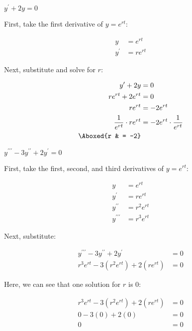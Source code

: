 \documentclass{lapchomework}
\begin{document}
\begin{problems}

\problem[11] $y^{\prime}+2y=0$

\begin{solution}

\step First, take the first derivative of $y=e^{rt}$:

\step \begin{align*}
y & = e^{rt} \\
y^{\prime} & = re^{rt}
\end{align*}

\step Next, substitute and solve for $r$:

\step \begin{align*}
y^{\prime} + 2y & = 0 \\
re^{rt} + 2e^{rt} & = 0 \\
re^{rt} & = -2e^{rt} \\
\frac{1}{e^{rt}} \cdot re^{rt} & = -2e^{rt} \cdot \frac{1}{e^{rt}} \\
\Aboxed{r & = -2}
\end{align*}
\end{solution}

\problem[13] $y^{\prime\prime\prime}-3y^{\prime\prime}+2y^{\prime}=0$

\begin{solution}

\step First, take the first, second, and third derivatives of $y=e^{rt}$:

\step \begin{align*}
y & = e^{rt} \\
y^{\prime} & = re^{rt} \\
y^{\prime\prime} & = r^2e^{rt} \\
y^{\prime\prime\prime} & = r^3e^{rt}
\end{align*}

\step Next, substitute:

\step \begin{align*}
y^{\prime\prime\prime}-3y^{\prime\prime}+2y^{\prime} & = 0 \\
r^3e^{rt} - 3(r^2e^{rt}) + 2(re^{rt}) & = 0
\end{align*}

\step Here, we can see that one solution for $r$ is $0$:

\step \begin{align*}
r^3e^{rt} - 3(r^2e^{rt}) + 2(re^{rt}) & = 0 \\
0 - 3(0) + 2(0) & = 0 \\
0 & = 0
\end{align*}


\end{solution}
\end{problems}
\end{document}

